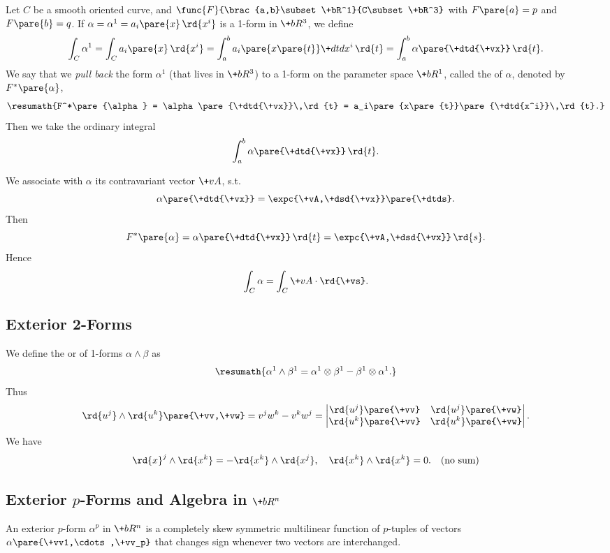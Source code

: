 \documentclass[hidelinks]{article}
\let\oldgloss\gloss
\def\gloss#1{\textbf{\oldgloss{#1}}}
\begin{document}
Let $C$ be a smooth oriented curve, and $\func{F}{\brac{a,b}\subset \+bR^1}{C\subset \+bR^3}$ with $F\pare{a} = p$ and $F\pare{b} = q$. If $\alpha = \alpha^1 = a_i\pare{x}\,\rd{x^i}$ is a 1-form in $\+bR^3$, we define
\[ \int_C \alpha^1 = \int_C a_i\pare{x}\,\rd{x^i} = \int_a^b a_i\pare{x\pare{t}}\+dtd{x^i}\,\rd{t} = \int_a^b \alpha\pare{\+dtd{\+vx}}\,\rd{t}. \]
We say that we \emph{pull back} the form $\alpha^1$ (that lives in $\+bR^3$) to a 1-form on the parameter space $\+bR^1$, called the  of $\alpha$, denoted by $F^*\pare{\alpha}$,
\[ \resumath{F^*\pare{\alpha} = \alpha\pare{\+dtd{\+vx}}\,\rd{t} = a_i\pare{x\pare{t}}\pare{\+dtd{x^i}}\,\rd{t}.} \]
Then we take the ordinary integral
\[ \int_a^b \alpha\pare{\+dtd{\+vx}}\,\rd{t}. \]
\par
We associate with $\alpha$ its contravariant vector $\+vA$, s.t.
\[ \alpha\pare{\+dtd{\+vx}} = \expc{\+vA,\+dsd{\+vx}}\pare{\+dtds}. \]
Then
\[ F^*\pare{\alpha} = \alpha\pare{\+dtd{\+vx}}\,\rd{t} = \expc{\+vA,\+dsd{\+vx}}\,\rd{s}. \]
Hence
\[ \int_C \alpha = \int_C \+vA\cdot \rd{\+vs}. \]


\subsection{Exterior 2-Forms} %
\label{sub:exterior_2_forms}

We define the  or  of 1-forms $\alpha\wedge\beta$ as
\[ \resumath{\alpha^1\wedge \beta^1 = \alpha^1\otimes \beta^1 - \beta^1\otimes \alpha^1.} \]
Thus
\[ \rd{u^j}\wedge\rd{u^k}\pare{\+vv,\+vw} = v^jw^k - v^kw^j = \begin{vmatrix}
    \rd{u^j}\pare{\+vv} & \rd{u^j}\pare{\+vw} \\
    \rd{u^k}\pare{\+vv} & \rd{u^k}\pare{\+vw}
\end{vmatrix}. \]
We have
\[ \rd{x}^j \wedge \rd{x^k} = -\rd{x^k}\wedge\rd{x^j},\quad \rd{x^k} \wedge\rd{x^k} = 0. \quad \text{(no sum)} \]


\subsection{Exterior \texorpdfstring{$p$}{p}-Forms and Algebra in \texorpdfstring{$\+bR^n$}{Rn}} %
\label{sub:exterior_p_forms_and_algebra_in_rn}

An exterior $p$-form $\alpha^p$ in $\+bR^n$ is a completely skew symmetric multilinear function of $p$-tuples of vectors $\alpha\pare{\+vv1,\cdots,\+vv_p}$ that changes sign whenever two vectors are interchanged.
\end{document}
